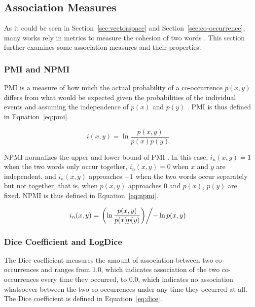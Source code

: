 \subsection{Association Measures}

As it could be seen in Section~\ref{sec:vectorspace} and
Section~\ref{sec:co-occurrence}, many works rely in metrics to measure the
cohesion of two words 
\citep{pantel2003clustering,pantel2002discovering,jurgens2010hermit,klapaftis2008word,korkontzelos2010uoy,correia2015syntax}.
This section further examines some association measures and their properties.

\subsubsection*{\acl*{PMI} and \acl*{NPMI}}
\label{subsec:pmi}

\ac{PMI} is a measure of how much the actual probability of a co-occurrence
$p(x,y)$ differs from what would be expected given the probabilities of the
individual events and assuming the independence of $p(x)$ and $p(y)$
\citep{bouma2009normalized}. \ac{PMI} is thus defined in Equation~\ref{eq:pmi}.

\begin{equation}
  \label{eq:pmi}
  i(x,y) = \ln \frac{p(x,y)}{p(x)p(y)}
\end{equation}

\ac{NPMI} normalizes the upper and lower bound of \ac{PMI} 
\citep{bouma2009normalized}.
In this case, $i_n(x,y) = 1$ when the two words only occur together,
$i_n(x,y) = 0$ when $x$ and $y$ are independent, and $i_n(x,y)$ approaches $-1$
when the two words occur separately but not together, that is, when $p(x,y)$
approaches 0 and $p(x)$, $p(y)$ are fixed. \ac{NPMI} is thus defined in
Equation~\ref{eq:npmi}.

\begin{equation}
  \label{eq:npmi}
  i_n(x,y) = \left. \left( \ln \frac{p(x,y)}{p(x)p(y)} \right) \middle/
             - \ln p(x,y) \right.
\end{equation}

\subsubsection*{Dice Coefficient and LogDice}
\label{subsec:dice}

The Dice coefficient measures the amount of association between two
co-occurrences \citep{dice1945measures} and ranges from $1.0$, which indicates
association of the two co-occurrences every time they occurred, to $0.0$, which
indicates no association whatsoever between the two co-occurrences under any
time they occurred at all. The Dice coefficient is defined in
Equation~\ref{eq:dice}.

